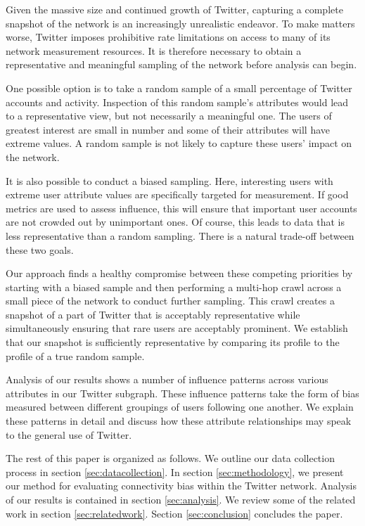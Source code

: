 Given the massive size and continued growth of Twitter, capturing a complete snapshot of the network is an increasingly unrealistic endeavor.  To make matters worse, 
Twitter imposes prohibitive rate limitations on access to many of its network measurement resources.  It is therefore necessary to obtain a representative and meaningful 
sampling of the network before analysis can begin.

One possible option is to take a random sample of a small percentage of Twitter accounts and activity.  Inspection of this random sample's attributes would lead to a 
representative view, but not necessarily a meaningful one.  The users of greatest interest are small in number and some of their attributes will have extreme values.  A 
random sample is not likely to capture these users' impact on the network.

It is also possible to conduct a biased sampling.  Here, interesting users with extreme user attribute values are specifically targeted for measurement.  If good 
metrics are used to assess influence, this will ensure that important user accounts are not crowded out by unimportant ones.  Of course, this leads to data that is less 
representative than a random sampling.  There is a natural trade-off between these two goals.

Our approach finds a healthy compromise between these competing priorities by starting with a biased sample and then performing a multi-hop crawl across a small piece of 
the network to conduct further sampling.  This crawl creates a snapshot of a part of Twitter that is acceptably representative while simultaneously ensuring that rare 
users are acceptably prominent.  We establish that our snapshot is sufficiently representative by comparing its profile to the profile of a true random sample.

Analysis of our results shows a number of influence patterns across various attributes in our Twitter subgraph.  These influence patterns take the form of bias measured 
between different groupings of users following one another.  We explain these patterns in detail and discuss how these attribute relationships may speak to the general 
use of Twitter.

The rest of this paper is organized as follows.  We outline our data collection process in section \ref{sec:datacollection}.  In section \ref{sec:methodology}, we 
present our method for evaluating connectivity bias within the Twitter network.  Analysis of our results is contained in section \ref{sec:analysis}.  We review some of 
the related work in section \ref{sec:relatedwork}.  Section \ref{sec:conclusion} concludes the paper.
